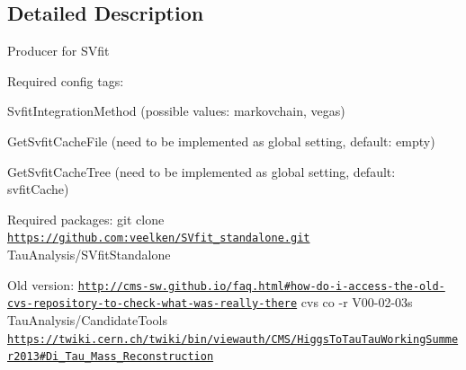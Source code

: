 \subsection{Detailed Description}
Producer for SVfit

Required config tags:
\begin{DoxyItemize}
\item SvfitIntegrationMethod (possible values: markovchain, vegas)
\item GetSvfitCacheFile (need to be implemented as global setting, default: empty)
\item GetSvfitCacheTree (need to be implemented as global setting, default: svfitCache)
\end{DoxyItemize}

Required packages: git clone \href{https://github.com:veelken/SVfit_standalone.git}{\tt https://github.com:veelken/SVfit\_\-standalone.git} TauAnalysis/SVfitStandalone

Old version: \href{http://cms-sw.github.io/faq.html#how-do-i-access-the-old-cvs-repository-to-check-what-was-really-there}{\tt http://cms-\/sw.github.io/faq.html\#how-\/do-\/i-\/access-\/the-\/old-\/cvs-\/repository-\/to-\/check-\/what-\/was-\/really-\/there} cvs co -\/r V00-\/02-\/03s TauAnalysis/CandidateTools \href{https://twiki.cern.ch/twiki/bin/viewauth/CMS/HiggsToTauTauWorkingSummer2013#Di_Tau_Mass_Reconstruction}{\tt https://twiki.cern.ch/twiki/bin/viewauth/CMS/HiggsToTauTauWorkingSummer2013\#Di\_\-Tau\_\-Mass\_\-Reconstruction} 

